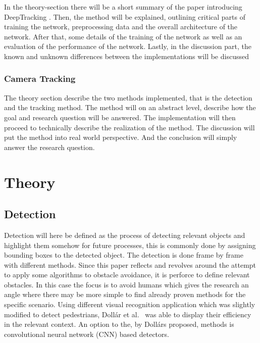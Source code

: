 \documentclass[a4paper]{article}
\begin{document}
In the theory-section there will be a short summary of the paper introducing DeepTracking \cite{DBLP:journals/corr/OndruskaP16}.
Then, the method will be explained, outlining critical parts of training the network, preprocessing data and the overall architecture of the network.
After that, some details of the training of the network as well as an evaluation of the performance of the network.
Lastly, in the discussion part, the known and unknown differences between the implementations will be discussed

\subsubsection{Camera Tracking}

The theory section describe the two methods implemented, that is the detection and the tracking method.
The method will on an abstract level, describe how the goal and research question will be answered.
The implementation will then proceed to technically describe the realization of the method.
The discussion will put the method into real world perspective. And the conclusion will simply answer the research question.

\section{Theory}

\subsection{Detection}

Detection will here be defined as the process of detecting relevant objects and highlight them somehow for future processes, this is commonly done by assigning bounding boxes to the detected object. The detection is done frame by frame with different methods.
Since this paper reflects and revolves around the attempt to apply some algorithms to obstacle avoidance, it is perforce to define relevant obstacles.
In this case the focus is to avoid humans which gives the research an angle where there may be more simple to find already proven methods for the specific scenario.
Using different visual recognition application which was slightly modified to detect pedestrians, Dollár et al.~\cite{dollar2014fast} was able to display their efficiency in the relevant context.
An option to the, by Dollárs\cite{dollar2014fast} proposed, methods is convolutional neural network (CNN) based detectors.
\end{document}

